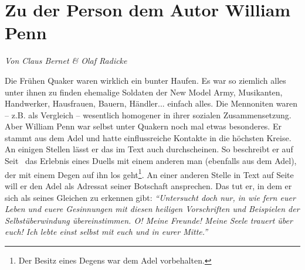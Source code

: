 %
%
%



\section{Zu der Person dem Autor William Penn} \label{ref:zum_autor_penn}

\begin{flushright}
\begin{footnotesize}
\textit{Von Claus Bernet \& Olaf Radicke}
\end{footnotesize}
\end{flushright}
\smallskip

Die Frühen Quaker waren wirklich ein bunter Haufen. Es war so ziemlich alles
unter ihnen zu finden ehemalige Soldaten der New Model Army, Musikanten, Handwerker, Hausfrauen, Bauern, Händler... einfach alles.
Die Mennoniten waren --
z.B. als Vergleich -- wesentlich homogener in ihrer sozialen Zusammensetzung.
Aber
William Penn war selbst unter Quakern noch mal etwas besonderes. Er stammt aus
dem Adel und hatte einflussreiche Kontakte in die höchsten Kreise. An einigen
Stellen lässt er das im Text auch durchscheinen. So beschreibt er auf
Seit~\pageref{kap9_ab2_duell_penn} das Erlebnis eines Duells
mit einem anderen man (ebenfalls aus dem Adel), der mit einem Degen auf ihn los
geht\footnote{Der Besitz eines
Degens war dem Adel vorbehalten.}. An einer anderen Stelle in Text auf
Seite~\pageref{15_04_penn_alte_freunde} will er den Adel als Adressat seiner
Botschaft ansprechen. Das tut er, in dem er sich als seines Gleichen zu erkennen
gibt:
\textit{"`Untersucht doch nur, in wie fern euer Leben und euere Gesinnungen mit
diesen heiligen Vorschriften und Beispielen der Selbstüberwindung
übereinstimmen. O! Meine Freunde! Meine Seele trauert über euch! Ich lebte einst
selbst mit euch und in eurer Mitte."'}


